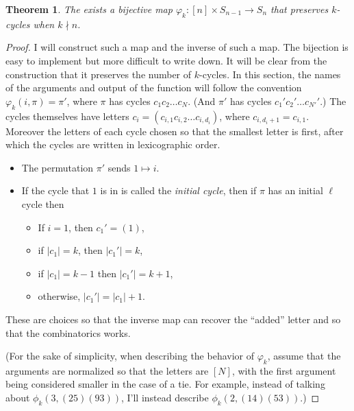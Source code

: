 \documentclass{article}
\numberwithin{equation}{subsection}
\newtheorem{theorem}[theo]{Theorem}
\begin{document}
\begin{theorem}
  \label{bijection}
  The exists a bijective map
  $\varphi_k \colon [n] \times S_{n-1} \rightarrow S_n$ that preserves
  $k$-cycles when $k \nmid n$.
\end{theorem}
\begin{proof}
  I will construct such a map and the inverse of such a map. The bijection is
  easy to implement but more difficult to write down. It will be clear
  from the construction that it preserves the number of $k$-cycles.
  In this section, the names of the arguments and output of the function will
  follow the convention $\varphi_k(i, \pi) = \pi'$, where $\pi$ has cycles
  $c_1 c_2 \dots c_N$. (And $\pi'$ has cycles $c_1' c_2' \dots c_{N'}'$.)
  The cycles themselves have letters $c_i = (c_{i,1} c_{i,2} \dots c_{i,d_i})$,
  where $c_{i,d_i + 1} = c_{i,1}$.
  Moreover the letters of each cycle chosen so that the smallest letter is first,
  after which the cycles are written in lexicographic order.

  \begin{itemize}
    \item The permutation $\pi'$ sends $1 \mapsto i$.
    \item If the cycle that $1$ is in is called the \textit{initial cycle},
      then if $\pi$ has an initial $\ell$ cycle then \begin{itemize}
        \item If $i = 1$, then $c_1' = (1)$,
        \item if $|c_1| = k$, then $|c_1'| = k$,
        \item if $|c_1| = k-1$ then $|c_1'| = k + 1$,
        \item otherwise, $|c_1'| = |c_1| + 1$.
      \end{itemize}
  \end{itemize}

  These are choices so that the inverse map can recover the ``added'' letter and
  so that the combinatorics works.

  (For the sake of simplicity, when describing the behavior of $\varphi_k$,
  assume that the arguments are normalized so that the letters are $[N]$, with
  the first argument being considered smaller in the case of a tie.
  For example, instead of talking about $\phi_k(3, (25)(93))$, I'll instead
  describe $\phi_k(2, (14)(53))$.)


\end{proof}
\end{document}
